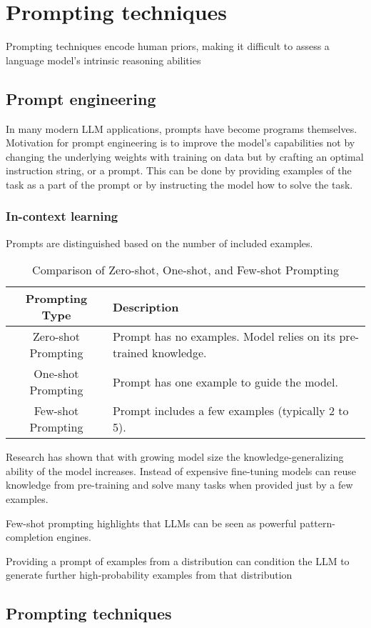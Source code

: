 \section{Prompting techniques}

Prompting techniques encode human priors, making it difficult to assess a language model's intrinsic reasoning abilities \cite{wang2024chainofthoughtreasoningprompting}

\subsection{Prompt engineering}
In many modern LLM applications, prompts have become programs themselves. \cite{schnabel2024symbolicpromptprogramsearch}
Motivation for prompt engineering is to improve the model's capabilities not by changing the underlying weights with training on data but by crafting an optimal instruction string, or a prompt.
This can be done by providing examples of the task as a part of the prompt or by instructing the model how to solve the task.

\subsubsection{In-context learning}
Prompts are distinguished based on the number of included examples.
\begin{table}[h!]
    \centering
    \begin{tabular}{|c|p{8cm}|}
    \hline
    \textbf{Prompting Type} & \textbf{Description} \\
    \hline
    Zero-shot Prompting & Prompt has no examples. Model relies on its pre-trained knowledge. \\
    \hline
    One-shot Prompting & Prompt has one example to guide the model. \\
    \hline
    Few-shot Prompting & Prompt includes a few examples (typically 2 to 5). \\
    \hline
    \end{tabular}
    \caption{Comparison of Zero-shot, One-shot, and Few-shot Prompting}
\end{table}        
Research\cite{brown2020languagemodelsfewshotlearners} has shown that with growing model size the knowledge-generalizing ability of the model increases. Instead of expensive fine-tuning
models can reuse knowledge from pre-training and solve many tasks when provided just by a few examples.

Few-shot prompting highlights that LLMs can be seen as powerful pattern-completion engines. \cite{meyerson2024languagemodelcrossovervariation}

Providing a prompt of examples from a distribution can condition the LLM to generate further high-probability examples from that distribution \cite{meyerson2024languagemodelcrossovervariation}

\subsection{Prompting techniques}
